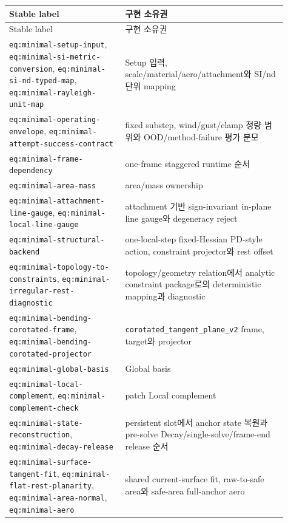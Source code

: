 \documentclass[10pt]{article}
\newcommand{\code}[1]{{\small\nolinkurl{#1}}}
\begin{document}
\begin{longtable}{L{0.38\linewidth}L{0.53\linewidth}}
\toprule
Stable label & 구현 소유권\\
\midrule
\endfirsthead
\toprule
Stable label & 구현 소유권\\
\midrule
\endhead
\code{eq:minimal-setup-input}, \code{eq:minimal-si-metric-conversion},
\code{eq:minimal-si-nd-typed-map}, \code{eq:minimal-rayleigh-unit-map} &
Setup 입력, scale/material/aero/attachment와 SI/nd 단위 mapping\\
\code{eq:minimal-operating-envelope},\newline
{\footnotesize\nolinkurl{eq:minimal-attempt-success-contract}} &
fixed substep, wind/gust/clamp 정량 범위와 OOD/method-failure 평가 분모\\
\code{eq:minimal-frame-dependency} & one-frame staggered runtime 순서\\
\code{eq:minimal-area-mass} & area/mass ownership\\
\code{eq:minimal-attachment-line-gauge}, \code{eq:minimal-local-line-gauge} &
attachment 기반 sign-invariant in-plane line gauge와 degeneracy reject\\
\code{eq:minimal-structural-backend} & one-local-step fixed-Hessian PD-style action,
constraint projector와 rest offset\\
\code{eq:minimal-topology-to-constraints},\newline
{\footnotesize\nolinkurl{eq:minimal-irregular-rest-diagnostic}} &
topology/geometry relation에서 analytic constraint package로의 deterministic mapping과 diagnostic\\
\code{eq:minimal-bending-corotated-frame},\newline
{\footnotesize\nolinkurl{eq:minimal-bending-corotated-projector}} &
\code{corotated\_tangent\_plane\_v2} frame, target와 projector\\
\code{eq:minimal-global-basis} & Global basis\\
\code{eq:minimal-local-complement}, \code{eq:minimal-complement-check} & patch Local complement\\
\code{eq:minimal-state-reconstruction}, \code{eq:minimal-decay-release} &
persistent slot에서 anchor state 복원과 pre-solve Decay/single-solve/frame-end release 순서\\
\code{eq:minimal-surface-tangent-fit}, \code{eq:minimal-flat-rest-planarity},
\code{eq:minimal-area-normal}, \code{eq:minimal-aero} &
shared current-surface fit, raw-to-safe area와 safe-area full-anchor aero\\

\end{longtable}
\end{document}
